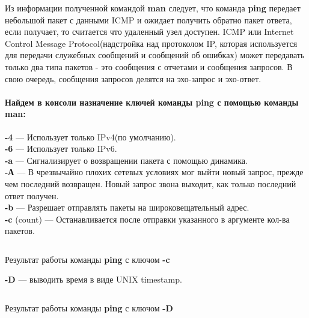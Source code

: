 Из информации полученной командой \textbf{man} следует, что команда \textbf{ping} передает небольшой пакет с данными ICMP и ожидает получить обратно пакет ответа, если получает, то считается что удаленный узел доступен. ICMP или Internet Control Message Protocol(надстройка над протоколом IP, которая используется для передачи служебных сообщений и сообщений об ошибках) может передавать только два типа пакетов - это сообщения с отчетами и сообщения запросов. В свою очередь, сообщения запросов делятся на эхо-запрос и эхо-ответ.

\paragraph{Найдем в консоли назначение ключей команды ping с помощью команды man:\\}

\textbf{-4} — Использует только IPv4(по умолчанию).\\
\textbf{-6} — Использует только IPv6.\\
\textbf{-a} — Сигнализирует о возвращении пакета с помощью динамика.\\
\textbf{-А} — В чрезвычайно плохих сетевых условиях мог выйти новый запрос, прежде чем последний возвращен. Новый запрос звона выходит, как только последний ответ получен.\\
\textbf{-b} — Разрешает отправлять пакеты на широковещательный адрес.\\
\textbf{-c} (count) — Останавливается после отправки указанного в аргументе кол-ва пакетов.\\

\begin{code}
	\inputminted[breaklines=true, xleftmargin=1em, linenos, frame=single, framesep=10pt, fontsize=\footnotesize, firstline=1, lastline=33]{haskell}{fig/ping-c.bash}
	\caption{Результат работы команды \textbf{ping} с ключом \textbf{-c}}
\end{code}

\newpage

\textbf{-D} — выводить время в виде UNIX timestamp.\\

\begin{code}
	\inputminted[breaklines=true, xleftmargin=1em, linenos, frame=single, framesep=10pt, fontsize=\footnotesize, firstline=1, lastline=33]{haskell}{fig/ping-D.bash}
	\caption{Результат работы команды \textbf{ping} с ключом \textbf{-D}}
\end{code}

